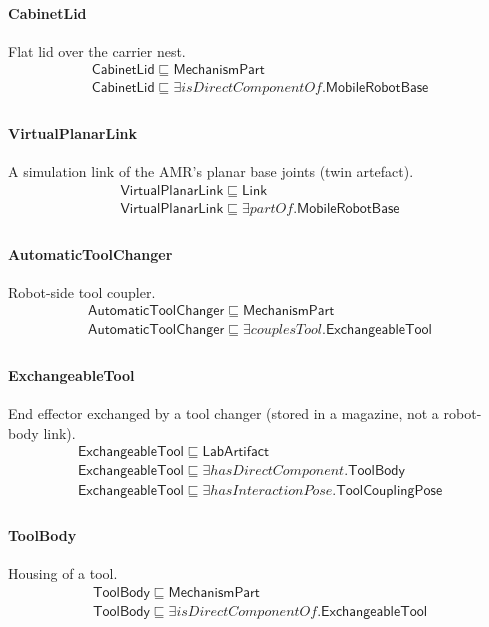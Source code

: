 \documentclass[10pt]{article}
\begin{document}
\paragraph{CabinetLid} Flat lid over the carrier nest.
\[\begin{array}{l}
\mathsf{CabinetLid} \sqsubseteq  \mathsf{MechanismPart} \\
\mathsf{CabinetLid} \sqsubseteq  \exists \mathit{isDirectComponentOf}.\mathsf{MobileRobotBase} \\
\end{array}\]
\paragraph{VirtualPlanarLink} A simulation link of the AMR's planar base joints (twin artefact).
\[\begin{array}{l}
\mathsf{VirtualPlanarLink} \sqsubseteq  \mathsf{Link} \\
\mathsf{VirtualPlanarLink} \sqsubseteq  \exists \mathit{partOf}.\mathsf{MobileRobotBase} \\
\end{array}\]
\paragraph{AutomaticToolChanger} Robot-side tool coupler.
\[\begin{array}{l}
\mathsf{AutomaticToolChanger} \sqsubseteq  \mathsf{MechanismPart} \\
\mathsf{AutomaticToolChanger} \sqsubseteq  \exists \mathit{couplesTool}.\mathsf{ExchangeableTool} \\
\end{array}\]
\paragraph{ExchangeableTool} End effector exchanged by a tool changer (stored in a magazine, not a robot-body link).
\[\begin{array}{l}
\mathsf{ExchangeableTool} \sqsubseteq  \mathsf{LabArtifact} \\
\mathsf{ExchangeableTool} \sqsubseteq  \exists \mathit{hasDirectComponent}.\mathsf{ToolBody} \\
\mathsf{ExchangeableTool} \sqsubseteq  \exists \mathit{hasInteractionPose}.\mathsf{ToolCouplingPose} \\
\end{array}\]
\paragraph{ToolBody} Housing of a tool.
\[\begin{array}{l}
\mathsf{ToolBody} \sqsubseteq  \mathsf{MechanismPart} \\
\mathsf{ToolBody} \sqsubseteq  \exists \mathit{isDirectComponentOf}.\mathsf{ExchangeableTool} \\
\end{array}\]
\end{document}
